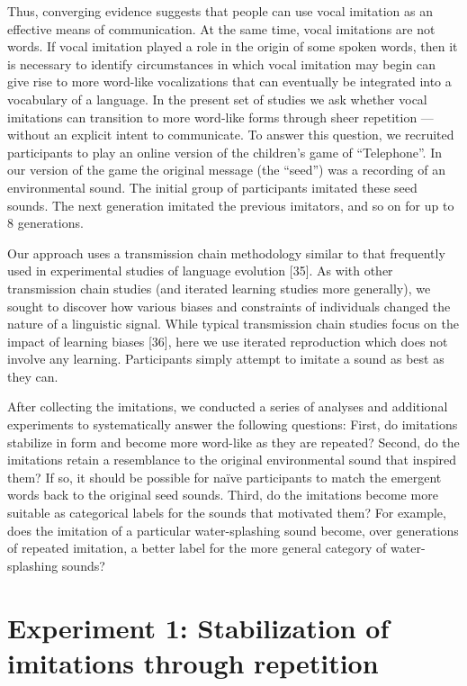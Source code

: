 \documentclass[english,floatsintext,man]{apa6}
\theoremstyle{definition}
\theoremstyle{definition}
\theoremstyle{definition}
\theoremstyle{remark}
\begin{document}
Thus, converging evidence suggests that people can use vocal imitation
as an effective means of communication. At the same time, vocal
imitations are not words. If vocal imitation played a role in the origin
of some spoken words, then it is necessary to identify circumstances in
which vocal imitation may begin can give rise to more word-like
vocalizations that can eventually be integrated into a vocabulary of a
language. In the present set of studies we ask whether vocal imitations
can transition to more word-like forms through sheer repetition ---
without an explicit intent to communicate. To answer this question, we
recruited participants to play an online version of the children's game
of \enquote{Telephone}. In our version of the game the original message
(the \enquote{seed}) was a recording of an environmental sound. The
initial group of participants imitated these seed sounds. The next
generation imitated the previous imitators, and so on for up to 8
generations.

Our approach uses a transmission chain methodology similar to that
frequently used in experimental studies of language evolution {[}35{]}.
As with other transmission chain studies (and iterated learning studies
more generally), we sought to discover how various biases and
constraints of individuals changed the nature of a linguistic signal.
While typical transmission chain studies focus on the impact of learning
biases {[}36{]}, here we use iterated reproduction which does not
involve any learning. Participants simply attempt to imitate a sound as
best as they can.

After collecting the imitations, we conducted a series of analyses and
additional experiments to systematically answer the following questions:
First, do imitations stabilize in form and become more word-like as they
are repeated? Second, do the imitations retain a resemblance to the
original environmental sound that inspired them? If so, it should be
possible for naïve participants to match the emergent words back to the
original seed sounds. Third, do the imitations become more suitable as
categorical labels for the sounds that motivated them? For example, does
the imitation of a particular water-splashing sound become, over
generations of repeated imitation, a better label for the more general
category of water-splashing sounds?

\hypertarget{experiment-1-stabilization-of-imitations-through-repetition}{%
\section{Experiment 1: Stabilization of imitations through
repetition}\label{experiment-1-stabilization-of-imitations-through-repetition}}
\end{document}
